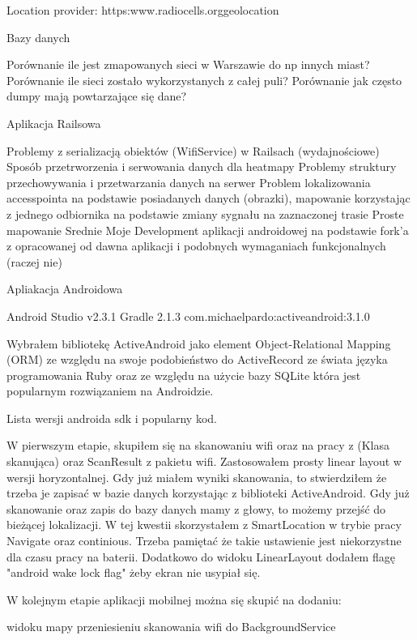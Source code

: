 Location provider: https:\/\/www.radiocells.org\/geolocation



Bazy danych

    Porównanie ile jest zmapowanych sieci w Warszawie do np innych miast?
    Porównanie ile sieci zostało wykorzystanych z całej puli?
    Porównanie jak często dumpy mają powtarzające się dane?


Aplikacja Railsowa

    Problemy z serializacją obiektów (WifiService) w Railsach (wydajnościowe)
    Sposób przetrworzenia i serwowania danych dla heatmapy
    Problemy struktury przechowywania i przetwarzania danych na serwer
    Problem lokalizowania accesspointa na podstawie posiadanych danych (obrazki), mapowanie korzystając z jednego odbiornika na podstawie zmiany sygnału na zaznaczonej trasie
        Proste mapowanie
        Srednie
        Moje
    Development aplikacji androidowej na podstawie fork'a z opracowanej od dawna aplikacji i podobnych wymaganiach funkcjonalnych (raczej nie)


Apliakacja Androidowa

    Android Studio v2.3.1
    Gradle 2.1.3
    com.michaelpardo:activeandroid:3.1.0

Wybrałem bibliotekę ActiveAndroid jako element Object-Relational Mapping (ORM) ze względu na swoje podobieństwo do ActiveRecord ze świata języka programowania Ruby oraz ze względu na użycie bazy SQLite która jest popularnym rozwiązaniem na Androidzie.

Lista wersji androida sdk i popularny kod.

W pierwszym etapie, skupiłem się na skanowaniu wifi oraz na pracy z (Klasa skanująca) oraz ScanResult z pakietu wifi. Zastosowałem prosty linear layout w wersji horyzontalnej. Gdy już miałem wyniki skanowania, to stwierdziłem że trzeba je zapisać w bazie danych korzystając z biblioteki ActiveAndroid. Gdy już skanowanie oraz zapis do bazy danych mamy z głowy, to możemy przejść do bieżącej lokalizacji. W tej kwestii skorzystałem z SmartLocation w trybie pracy Navigate oraz continious. Trzeba pamiętać że takie ustawienie jest niekorzystne dla czasu pracy na baterii. Dodatkowo do widoku LinearLayout dodałem flagę "android wake lock flag" żeby ekran nie usypiał się.

W kolejnym etapie aplikacji mobilnej można się skupić na dodaniu:

    widoku mapy
    przeniesieniu skanowania wifi do BackgroundService

